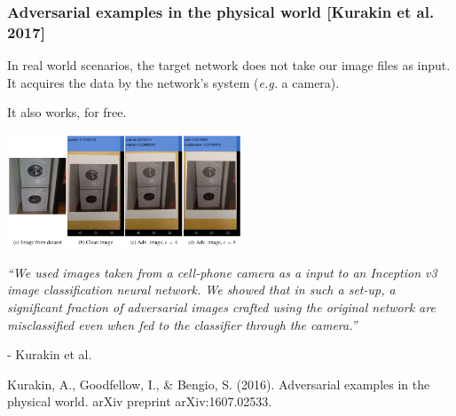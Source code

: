 \documentclass[9pt]{beamer}
\begin{document}
\begin{frame}
  \frametitle{Adversarial examples in the physical world [Kurakin et
      al. 2017]}

  In real world scenarios, the target network does not take our image
  files as input. It acquires the data by the network's system
  (\textit{e.g.} a camera).

  \medskip

  It also works, for free.

  \begin{center}
    \includegraphics[width = 7cm]{images/physical_adversarial_sample.png}
  \end{center}


  \textit{``We used images taken from a cell-phone camera as a input
    to an Inception v3 image classification neural network. We showed
    that in such a set-up, a significant fraction of adversarial
    images crafted using the original network are misclassified even
    when fed to the classifier through the camera.''}

  \smallskip

  - Kurakin et al.

  \smallskip

  {\scriptsize Kurakin, A., Goodfellow, I., \& Bengio,
    S. (2016). Adversarial examples in the physical world. arXiv
    preprint arXiv:1607.02533.}

\end{frame}
\end{document}
